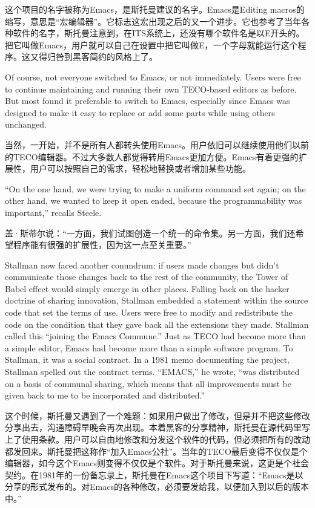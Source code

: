 \ifdefined\chs
这个项目的名字被称为Emacs，是斯托曼建议的名字。Emacs是Editing macros的缩写，意思是``宏编辑器''。它标志这宏出现之后的又一个进步。它也参考了当年各种软件的名字，斯托曼注意到，在ITS系统上，还没有哪个软件名是以E开头的。把它叫做Emacs，用户就可以自己在设置中把它叫做E，一个字母就能运行这个程序。这又得归咎到黑客简约的风格上了。
\fi

\ifdefined\eng
Of course, not everyone switched to Emacs, or not immediately.  Users were free to continue maintaining and running their own TECO-based editors as before.  But most found it preferable to switch to Emacs, especially since Emacs was designed to make it easy to replace or add some parts while using others unchanged.
\fi

\ifdefined\chs
当然，一开始，并不是所有人都转头使用Emacs。用户依旧可以继续使用他们以前的TECO编辑器。不过大多数人都觉得转用Emacs更加方便。Emacs有着更强的扩展性，用户可以按照自己的需求，轻松地替换或者增加某些功能。
\fi

\ifdefined\eng
``On the one hand, we were trying to make a uniform command set again; on the other hand, we wanted to keep it open ended, because the programmability was important,'' recalls Steele.
\fi

\ifdefined\chs
盖·斯蒂尔说：``一方面，我们试图创造一个统一的命令集。另一方面，我们还希望程序能有很强的扩展性，因为这一点至关重要。''
\fi

\ifdefined\eng
Stallman now faced another conundrum: if users made changes but didn't communicate those changes back to the rest of the community, the Tower of Babel effect would simply emerge in other places. Falling back on the hacker doctrine of sharing innovation, Stallman embedded a statement within the source code that set the terms of use. Users were free to modify and redistribute the code on the condition that they gave back all the extensions they made. Stallman called this ``joining the Emacs Commune.'' Just as TECO had become more than a simple editor, Emacs had become more than a simple software program. To Stallman, it was a social contract. In a 1981 memo documenting the project, Stallman spelled out the contract terms. ``EMACS,'' he wrote, ``was distributed on a basis of communal sharing, which means that all improvements must be given back to me to be incorporated and distributed.''
\fi

\ifdefined\chs
这个时候，斯托曼又遇到了一个难题：如果用户做出了修改，但是并不把这些修改分享出去，沟通障碍早晚会再次出现。本着黑客的分享精神，斯托曼在源代码里写上了使用条款。用户可以自由地修改和分发这个软件的代码，但必须把所有的改动都发回来。斯托曼把这称作``加入Emacs公社''。当年的TECO最后变得不仅仅是个编辑器，如今这个Emacs则变得不仅仅是个软件。对于斯托曼来说，这更是个社会契约。在1981年的一份备忘录上，斯托曼在Emacs这个项目下写道：``Emacs是以分享的形式发布的。对Emacs的各种修改，必须要发给我，以便加入到以后的版本中。''
\fi

